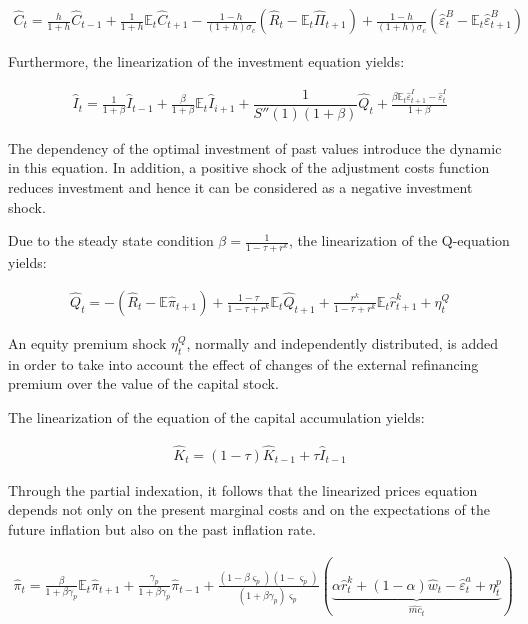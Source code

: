 \documentclass{pracamgr}
\numberwithin{equation}{section}
\begin{document}
\begin{align}
\hat{C}_{t} = \frac{h}{1+h}\hat{C}_{t-1}+ \frac{1}{1+h}\mathbb{E}_{t}\hat{C}_{t+1} - \frac{1-h}{(1+h)\sigma_{c}} \left( \hat{R}_{t} - \mathbb{E}_{t} \hat{\Pi}_{t+1} \right) + \frac{1-h}{(1+h)\sigma_{c}} \left( \hat{\varepsilon}_{t}^{B} - \mathbb{E}_{t}\hat{\varepsilon}_{t+1}^{B} \right)
\end{align}

Furthermore, the linearization of the investment equation yields:

\begin{align}
\hat{I}_{t} = \frac{1}{1+\beta} \hat{I}_{t-1} + \frac{\beta}{1+\beta} \mathbb{E}_{t} \hat{I}_{i+1} + \dfrac{1}{S''(1)(1+\beta)}\hat{Q}_{t} + \frac{\beta \mathbb{E}_{t} \hat{\varepsilon}_{t+1}^{I} - \hat{\varepsilon}_{t}^{I}}{1+\beta}
\end{align}

The dependency of the optimal investment of past values introduce the dynamic in this equation. In addition, a positive shock of the adjustment costs function reduces investment and hence it can be considered as a negative investment shock.

Due to the steady state condition $\beta = \frac{1}{1-\tau +r^{k}}$, the linearization of the Q-equation yields:

\begin{align}
\hat{Q}_{t} = - \left( \hat{R}_{t} - \mathbb{E}\hat{\pi}_{t+1} \right) + \frac{1-\tau}{1-\tau +r^{k}} \mathbb{E}_{t} \hat{Q}_{t+1} + \frac{r^{k}}{1-\tau +r^{k}} \mathbb{E}_{t}\hat{r}^{k}_{t+1} + \eta_{t}^{Q}
\end{align}

An equity premium shock $\eta_{t}^{Q}$, normally and independently distributed, is added in order to take into account the effect of changes of the external refinancing premium over the value of the capital stock.

The linearization of the equation of the capital accumulation yields:

\begin{align}
\hat{K}_{t} = (1-\tau)\hat{K}_{t-1} + \tau\hat{I}_{t-1}
\end{align}

Through the partial indexation, it follows that the linearized prices equation depends not only on the present marginal costs and on the expectations of the future inflation but also on the past inflation rate.

\begin{align}
\hat{\pi}_{t} = \frac{\beta}{1+\beta \gamma_{p}} \mathbb{E}_{t} \hat{\pi}_{t+1} + \frac{\gamma_{p}}{1+\beta \gamma_{p}} \hat{\pi}_{t-1} + \frac{\left( 1 - \beta \varsigma_{p} \right) \left( 1 - \varsigma_{p} \right)}{\left(1+\beta \gamma_{p} \right) \varsigma_{p}} \left( \underbrace{ \alpha \hat{r}^{k}_{t} + (1-\alpha)\hat{w}_{t} - \hat{\varepsilon}_{t}^{a} + \eta_{t}^{p} }_{\hat{mc}_{t}} \right)
\end{align}
\end{document}
